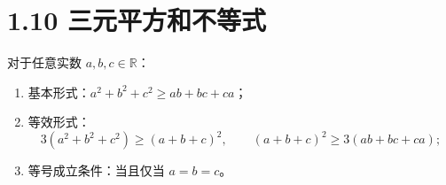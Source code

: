 \documentclass{article}
\begin{document}
\section*{1.10 三元平方和不等式}
对于任意实数 \( a,b,c \in \mathbb{R} \)：
\begin{enumerate}
    \item 基本形式：\( a^2+b^2+c^2 \geq ab+bc+ca \)；
    \item 等效形式：
    \[
    3(a^2+b^2+c^2) \geq (a+b+c)^2,\qquad (a+b+c)^2 \geq 3(ab+bc+ca);
    \]
    \item 等号成立条件：当且仅当 \( a=b=c \)。
\end{enumerate}
\end{document}
